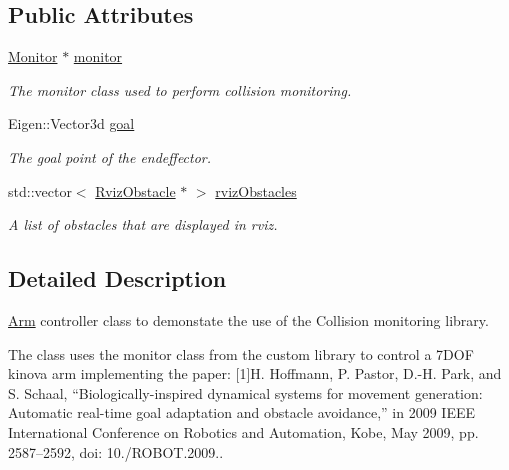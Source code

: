 \subsection*{Public Attributes}
\begin{DoxyCompactItemize}
\item 
\hyperlink{class_monitor}{Monitor} $\ast$ \hyperlink{class_arm_controller_a939747279bba6db315f80092a74c2629}{monitor}\hypertarget{class_arm_controller_a939747279bba6db315f80092a74c2629}{}\label{class_arm_controller_a939747279bba6db315f80092a74c2629}

\begin{DoxyCompactList}\small\item\em The monitor class used to perform collision monitoring. \end{DoxyCompactList}\item 
Eigen\+::\+Vector3d \hyperlink{class_arm_controller_a5246aa4a2072b1511d510717fc253f88}{goal}\hypertarget{class_arm_controller_a5246aa4a2072b1511d510717fc253f88}{}\label{class_arm_controller_a5246aa4a2072b1511d510717fc253f88}

\begin{DoxyCompactList}\small\item\em The goal point of the endeffector. \end{DoxyCompactList}\item 
std\+::vector$<$ \hyperlink{class_rviz_obstacle}{Rviz\+Obstacle} $\ast$ $>$ \hyperlink{class_arm_controller_ab94a1abce40096f6476404d49d00860f}{rviz\+Obstacles}\hypertarget{class_arm_controller_ab94a1abce40096f6476404d49d00860f}{}\label{class_arm_controller_ab94a1abce40096f6476404d49d00860f}

\begin{DoxyCompactList}\small\item\em A list of obstacles that are displayed in rviz. \end{DoxyCompactList}\end{DoxyCompactItemize}


\subsection{Detailed Description}
\hyperlink{class_arm}{Arm} controller class to demonstate the use of the Collision monitoring library.

The class uses the monitor class from the custom library to control a 7\+D\+OF kinova arm implementing the paper\+: \mbox{[}1\mbox{]}H. Hoffmann, P. Pastor, D.-\/H. Park, and S. Schaal, “\+Biologically-\/inspired dynamical systems for movement generation\+: Automatic real-\/time goal adaptation and obstacle avoidance,” in 2009 I\+E\+EE International Conference on Robotics and Automation, Kobe, May 2009, pp. 2587–2592, doi\+: 10./\+R\+O\+B\+OT.2009.. 

